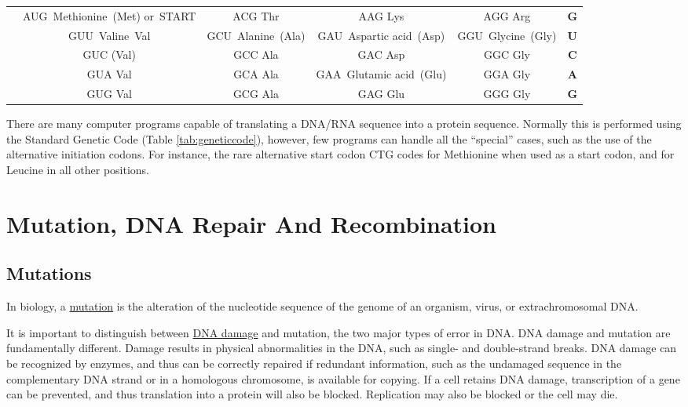 \begin{longtable}[t]{>{\bfseries}ccccc>{\bfseries}c}
\multirow{-4}{*}{\centering\arraybackslash A} & AUG Methionine (Met) or START & ACG Thr & AAG Lys & AGG Arg & G\\
\cmidrule{1-6}
\rowcolor{gray!6}   & GUU Valine Val & GCU Alanine (Ala) & GAU Aspartic acid (Asp) & GGU Glycine (Gly) & U\\

 & GUC (Val) & GCC Ala & GAC Asp & GGC Gly & C\\

\rowcolor{gray!6}   & GUA Val & GCA Ala & GAA Glutamic acid (Glu) & GGA Gly & A\\

\multirow{-4}{*}{\centering\arraybackslash G} & GUG Val & GCG Ala & GAG Glu & GGG Gly & G\\
\bottomrule
\end{longtable}
\endgroup{}

There are many computer programs capable of translating a DNA/RNA sequence into a protein sequence. Normally this is performed using the Standard Genetic Code (Table \ref{tab:geneticcode}), however, few programs can handle all the ``special'' cases, such as the use of the alternative initiation codons. For instance, the rare alternative start codon CTG codes for Methionine when used as a start codon, and for Leucine in all other positions.

\hypertarget{mutation-dna-repair-and-recombination}{%
\chapter{Mutation, DNA Repair And Recombination}\label{mutation-dna-repair-and-recombination}}

\hypertarget{mutations-1}{%
\section{Mutations}\label{mutations-1}}

In biology, a \href{https://en.wikipedia.org/wiki/Mutation}{mutation} is the alteration of the nucleotide sequence of the genome of an organism, virus, or extrachromosomal DNA.

It is important to distinguish between \href{https://en.wikipedia.org/wiki/DNA_damage_(naturally_occurring)}{DNA damage} and mutation, the two major types of error in DNA. DNA damage and mutation are fundamentally different. Damage results in physical abnormalities in the DNA, such as single- and double-strand breaks. DNA damage can be recognized by enzymes, and thus can be correctly repaired if redundant information, such as the undamaged sequence in the complementary DNA strand or in a homologous chromosome, is available for copying. If a cell retains DNA damage, transcription of a gene can be prevented, and thus translation into a protein will also be blocked. Replication may also be blocked or the cell may die.

